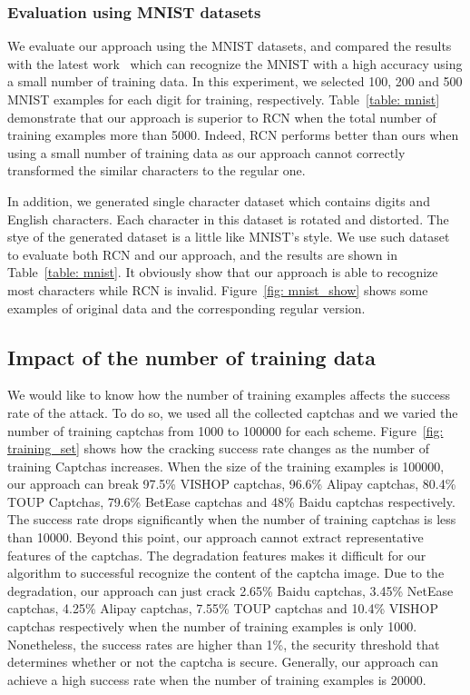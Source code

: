 \subsubsection{Evaluation using MNIST datasets}
We evaluate our approach using the MNIST datasets, and compared the results with the latest work~\cite{George2017A} which can recognize the MNIST with a high accuracy using a small number of training data. In this experiment, we selected 100, 200 and 500 MNIST examples for each digit for training, respectively.
Table~\ref{table: mnist} demonstrate that our approach is superior to RCN when the total number of training examples more than 5000. Indeed, RCN performs better than ours when using a small number of training data as our approach cannot correctly transformed the similar characters to the regular one.

In addition, we generated single character dataset which contains digits and English characters. Each character in this dataset is rotated and distorted. The stye of the generated dataset is a little like MNIST's style.
We use such dataset to evaluate both RCN and our approach, and the results are shown in Table~\ref{table: mnist}. It obviously show that our approach is able to recognize most characters while RCN is invalid. Figure~\ref{fig: mnist_show} shows some examples of original data and the corresponding regular version.

\subsection{Impact of the number of training data}
We would like to know how the number of training examples affects the success rate of the attack. To do so, we used all the collected captchas and we varied the number of training captchas from 1000 to 100000 for each scheme. Figure~\ref{fig: training_set} shows how the cracking success rate changes as the number of training Captchas increases. When the size of the training examples is 100000, our approach can break 97.5\% VISHOP captchas, 96.6\% Alipay captchas, 80.4\% TOUP Captchas, 79.6\% BetEase captchas and 48\% Baidu captchas respectively. The success rate drops significantly when the number of training captchas is less than 10000. Beyond this point, our approach cannot extract representative features of the captchas. The degradation features makes it difficult for our algorithm to successful recognize the content of the captcha image.
Due to the degradation, our approach can just crack 2.65\% Baidu captchas, 3.45\% NetEase captchas, 4.25\% Alipay captchas, 7.55\% TOUP captchas and 10.4\% VISHOP captchas respectively when the number of training examples is only 1000. Nonetheless, the success rates are higher than 1\%, the security threshold that determines whether or not the captcha is secure.
Generally, our approach can achieve a high success rate when the number of training examples is 20000.

